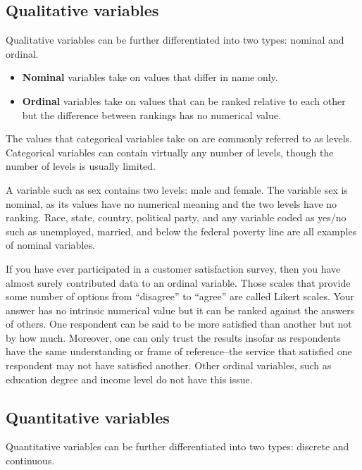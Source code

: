 \documentclass[
]{book}
\providecommand{\tightlist}{%
  \setlength{\itemsep}{0pt}\setlength{\parskip}{0pt}}
\begin{document}
\hypertarget{qualitative-variables}{%
\subsection{Qualitative variables}\label{qualitative-variables}}

Qualitative variables can be further differentiated into two types: nominal and ordinal.

\begin{itemize}
\tightlist
\item
  \textbf{Nominal} variables take on values that differ in name only.
\item
  \textbf{Ordinal} variables take on values that can be ranked relative to each other but the difference between rankings has no numerical value.
\end{itemize}

The values that categorical variables take on are commonly referred to as levels. Categorical variables can contain virtually any number of levels, though the number of levels is usually limited.

A variable such as sex contains two levels: male and female. The variable sex is nominal, as its values have no numerical meaning and the two levels have no ranking. Race, state, country, political party, and any variable coded as yes/no such as unemployed, married, and below the federal poverty line are all examples of nominal variables.

If you have ever participated in a customer satisfaction survey, then you have almost surely contributed data to an ordinal variable. Those scales that provide some number of options from ``disagree'' to ``agree'' are called Likert scales. Your answer has no intrinsic numerical value but it can be ranked against the answers of others. One respondent can be said to be more satisfied than another but not by how much. Moreover, one can only trust the results insofar as respondents have the same understanding or frame of reference--the service that satisfied one respondent may not have satisfied another. Other ordinal variables, such as education degree and income level do not have this issue.

\hypertarget{quantitative-variables}{%
\subsection{Quantitative variables}\label{quantitative-variables}}

Quantitative variables can be further differentiated into two types: discrete and continuous.
\end{document}
